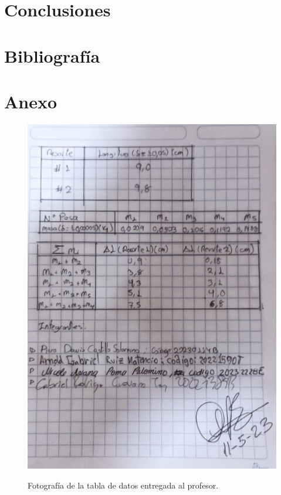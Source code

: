 \documentclass[12pt,a4paper]{article}
\begin{document}
\section{Conclusiones} %

\section{Bibliografía} %
\renewcommand{\bibsection}{}
%

\newpage
\listoffigures
\listoftables
\newpage
\section{Anexo}
\begin{figure}[H]
    \centering
    \includegraphics[width=0.6\linewidth]{images/anexo.jpg}
    \label{ref:anexo}
    \caption{Fotografía de la tabla de datos entregada al profesor.}
\end{figure}
\end{document}

